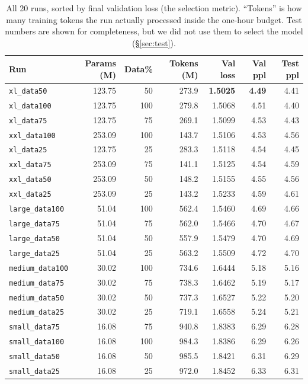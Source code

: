 \documentclass[12pt]{article}
\begin{document}
\begin{table}[htbp]
  \centering
  \caption{All 20 runs, sorted by final validation loss (the selection metric).
  ``Tokens'' is how many training tokens the run actually processed inside the
  one-hour budget. Test numbers are shown for completeness, but we did not use them to
  select the model (\S\ref{sec:test}).}
  \label{tab:results}
  \small
  \begin{tabular}{lrrrrrr}
    \toprule
    Run & Params (M) & Data\% & Tokens (M) & Val loss & Val ppl & Test ppl \\
    \midrule
    \texttt{xl\_data50}      & 123.75 &  50 & 273.9 & \textbf{1.5025} & \textbf{4.49} & 4.41 \\
    \texttt{xl\_data100}     & 123.75 & 100 & 279.8 & 1.5068 & 4.51 & 4.40 \\
    \texttt{xl\_data75}      & 123.75 &  75 & 269.1 & 1.5099 & 4.53 & 4.43 \\
    \texttt{xxl\_data100}    & 253.09 & 100 & 143.7 & 1.5106 & 4.53 & 4.56 \\
    \texttt{xl\_data25}      & 123.75 &  25 & 283.3 & 1.5118 & 4.54 & 4.45 \\
    \texttt{xxl\_data75}     & 253.09 &  75 & 141.1 & 1.5125 & 4.54 & 4.59 \\
    \texttt{xxl\_data50}     & 253.09 &  50 & 148.2 & 1.5155 & 4.55 & 4.56 \\
    \texttt{xxl\_data25}     & 253.09 &  25 & 143.2 & 1.5233 & 4.59 & 4.61 \\
    \texttt{large\_data100}  &  51.04 & 100 & 562.4 & 1.5460 & 4.69 & 4.66 \\
    \texttt{large\_data75}   &  51.04 &  75 & 562.0 & 1.5466 & 4.70 & 4.67 \\
    \texttt{large\_data50}   &  51.04 &  50 & 557.9 & 1.5479 & 4.70 & 4.69 \\
    \texttt{large\_data25}   &  51.04 &  25 & 563.2 & 1.5509 & 4.72 & 4.70 \\
    \texttt{medium\_data100} &  30.02 & 100 & 734.6 & 1.6444 & 5.18 & 5.16 \\
    \texttt{medium\_data75}  &  30.02 &  75 & 738.3 & 1.6462 & 5.19 & 5.17 \\
    \texttt{medium\_data50}  &  30.02 &  50 & 737.3 & 1.6527 & 5.22 & 5.20 \\
    \texttt{medium\_data25}  &  30.02 &  25 & 719.1 & 1.6558 & 5.24 & 5.21 \\
    \texttt{small\_data75}   &  16.08 &  75 & 940.8 & 1.8383 & 6.29 & 6.28 \\
    \texttt{small\_data100}  &  16.08 & 100 & 984.3 & 1.8386 & 6.29 & 6.26 \\
    \texttt{small\_data50}   &  16.08 &  50 & 985.5 & 1.8421 & 6.31 & 6.29 \\
    \texttt{small\_data25}   &  16.08 &  25 & 972.0 & 1.8452 & 6.33 & 6.31 \\
    \bottomrule
  \end{tabular}
\end{table}
\end{document}
